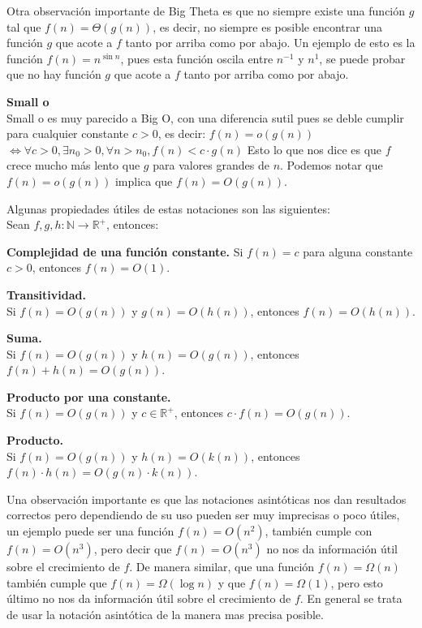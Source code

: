 \documentclass[
 12pt,
 letterpaper,
]{article}
\theoremstyle{teoremaBreak}
\theoremstyle{plain}
\theoremstyle{definition}
\begin{document}
Otra observación importante de Big Theta es que no siempre existe una función $g$ tal que $f(n) = \Theta(g(n))$, es decir, 
no siempre es posible encontrar una función $g$ que acote a $f$ tanto por arriba como por abajo. 
Un ejemplo de esto es la función $f(n) = n^{\sin n}$, pues esta función oscila entre $n^{-1}$ y $n^1$, se puede probar 
que no hay función $g$ que acote a $f$ tanto por arriba como por abajo.

\textbf{Small o}\\
Small o es muy parecido a Big O, con una diferencia sutil pues se deble cumplir para cualquier 
constante $c > 0$, es decir:
$f(n) = o(g(n))$ $\Leftrightarrow \forall c > 0, \exists n_0 > 0, \forall n > n_0, f(n) < c \cdot g(n)$
Esto lo que nos dice es que $f$ crece mucho más lento que $g$ para valores grandes de $n$.
Podemos notar que $f(n) = o(g(n))$ implica que $f(n) = O(g(n))$.

Algunas propiedades útiles de estas notaciones son las siguientes:\\
Sean $f, g, h: \mathbb{N} \to \mathbb{R}^+$, entonces:

\textbf{Complejidad de una función constante.}
Si $f(n) = c$ para alguna constante $c > 0$, entonces $f(n) = O(1)$.

\textbf{Transitividad.}\\
Si $f(n) = O(g(n))$ y $g(n) = O(h(n))$, entonces $f(n) = O(h(n))$.

\textbf{Suma.}\\
Si $f(n) = O(g(n))$ y $h(n) = O(g(n))$, entonces $f(n) + h(n) = O(g(n))$.

\textbf{Producto por una constante.}\\
Si $f(n) = O(g(n))$ y $c \in \mathbb{R}^+$, entonces $c \cdot f(n) = O(g(n))$.

\textbf{Producto.}\\
Si $f(n) = O(g(n))$ y $h(n) = O(k(n))$, entonces $f(n) \cdot h(n) = O(g(n) \cdot k(n))$.

Una observación importante es que las notaciones asintóticas nos dan resultados correctos pero dependiendo
de su uso pueden ser muy imprecisas o poco útiles, un ejemplo puede ser una función $f(n) = O(n^2)$, también
cumple con $f(n) = O(n^3)$, pero decir que $f(n) = O(n^3)$ no nos da información útil sobre el crecimiento de $f$. 
De manera similar, que una función $f(n) = \Omega(n)$ también cumple que $f(n) = \Omega(\log n)$ y que $f(n) = \Omega(1)$, 
pero esto último no nos da información útil sobre el crecimiento de $f$. 
En general se trata de usar la notación asintótica de la manera mas precisa posible.
\end{document}
